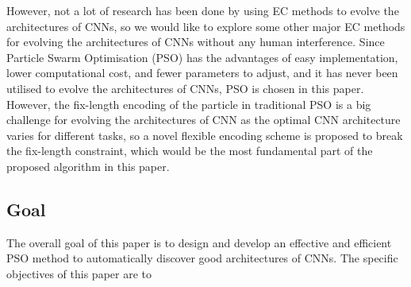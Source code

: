 \documentclass[conference]{IEEEtran}
\begin{document}

However, not a lot of research has been done by using EC methods to evolve the architectures of CNNs, so we would like to explore some other major EC methods for evolving the architectures of CNNs without any human interference. Since Particle Swarm Optimisation (PSO) has the advantages of easy implementation, lower computational cost, and fewer parameters to adjust, and it has never been utilised to evolve the architectures of CNNs, PSO is chosen in this paper. However, the fix-length encoding of the particle in traditional PSO is a big challenge for evolving the architectures of CNN as the optimal CNN architecture varies for different tasks, so a novel flexible encoding scheme is proposed to break the fix-length constraint, which would be the most fundamental part of the proposed algorithm in this paper. 


\subsection{Goal}
The overall goal of this paper is to design and develop an effective and efficient PSO method to automatically discover good architectures of CNNs. The specific objectives of this paper are to
\end{document}
